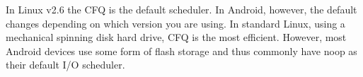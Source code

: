 \documentclass[a4paper]{article}
\begin{document}
In Linux v2.6 the CFQ is the default scheduler. In Android, however, the default changes depending on which version you are using. In standard Linux, using a mechanical spinning disk hard drive, CFQ is the most efficient. However, most Android devices use some form of flash storage and thus commonly have noop as their default I/O scheduler. 
\end{document}
